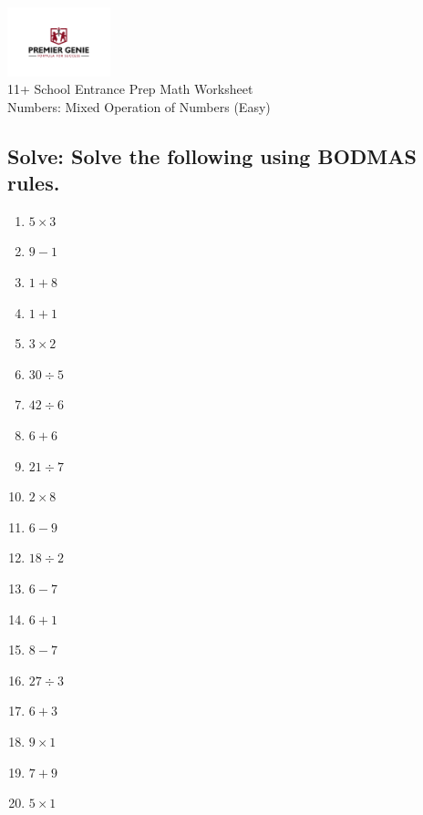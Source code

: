 \documentclass{article}
\begin{document}
\begin{center}
\includegraphics[width=3cm]{PREMGENIEJPG.jpg}\\
{\Large 11+ School Entrance Prep Math Worksheet}\\
{\Medium Numbers: Mixed Operation of Numbers (Easy)}\\

\end{center}

\subsection*{Solve: Solve the following using BODMAS rules.}

\begin{enumerate}
\item $\displaystyle {5}\times{3} $ \ 
\item $\displaystyle {9}-{1} $ \ 
\item $\displaystyle {1}+{8} $ \ 
\item $\displaystyle {1}+{1} $ \ 
\item $\displaystyle {3}\times{2} $ \ 
\item $\displaystyle 30\div{5} $ \ 
\item $\displaystyle 42\div{6} $ \ 
\item $\displaystyle {6}+{6} $ \ 
\item $\displaystyle 21\div{7} $ \ 
\item $\displaystyle {2}\times{8} $ \ 
\item $\displaystyle {6}-{9} $ \ 
\item $\displaystyle 18\div{2} $ \ 
\item $\displaystyle {6}-{7} $ \ 
\item $\displaystyle {6}+{1} $ \ 
\item $\displaystyle {8}-{7} $ \ 
\item $\displaystyle 27\div{3} $ \ 
\item $\displaystyle {6}+{3} $ \ 
\item $\displaystyle {9}\times{1} $ \ 
\item $\displaystyle {7}+{9} $ \ 
\item $\displaystyle {5}\times{1} $ \ 


\end{enumerate}
\end{document}

